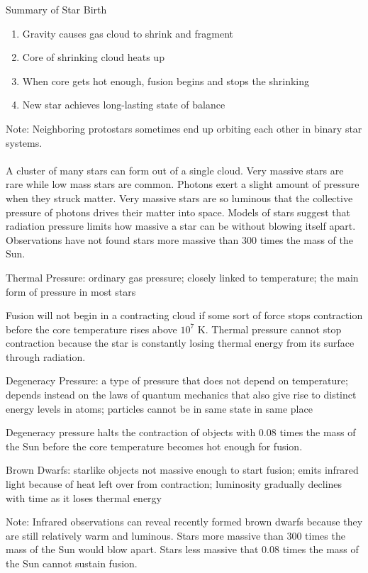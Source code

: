 \documentclass[12pt]{article}
\begin{document}
Summary of Star Birth \begin{enumerate} 
\item Gravity causes gas cloud to shrink and fragment 
\item Core of shrinking cloud heats up
\item When core gets hot enough, fusion begins and stops the shrinking
\item New star achieves long-lasting state of balance \end{enumerate} 
Note: Neighboring protostars sometimes end up orbiting each other in binary star systems. \\~\\
A cluster of many stars can form out of a single cloud. Very massive stars are rare while low mass stars are common. Photons exert a slight amount of pressure when they struck matter. Very massive stars are so luminous that the collective pressure of photons drives their matter into space. Models of stars suggest that radiation pressure limits how massive a star can be without blowing itself apart. Observations have not found stars more massive than 300 times the mass of the Sun.
\begin{definition} Thermal Pressure: ordinary gas pressure; closely linked to temperature; the main form of pressure in most stars \end{definition}
Fusion will not begin in a contracting cloud if some sort of force stops contraction before the core temperature rises above $10^7$ K. Thermal pressure cannot stop contraction because the star is constantly losing thermal energy from its surface through radiation. 
\begin{definition} Degeneracy Pressure: a type of pressure that does not depend on temperature; depends instead on the laws of quantum mechanics that also give rise to distinct energy levels in atoms; particles cannot be in same state in same place \end{definition}
Degeneracy pressure halts the contraction of objects with 0.08 times the mass of the Sun before the core temperature becomes hot enough for fusion. 
\begin{definition} Brown Dwarfs: starlike objects not massive enough to start fusion; emits infrared light because of heat left over from contraction; luminosity gradually declines with time as it loses thermal energy \end{definition}
Note: Infrared observations can reveal recently formed brown dwarfs because they are still relatively warm and luminous. Stars more massive than 300 times the mass of the Sun would blow apart. Stars less massive that 0.08 times the mass of the Sun cannot sustain fusion. 
\end{document}
